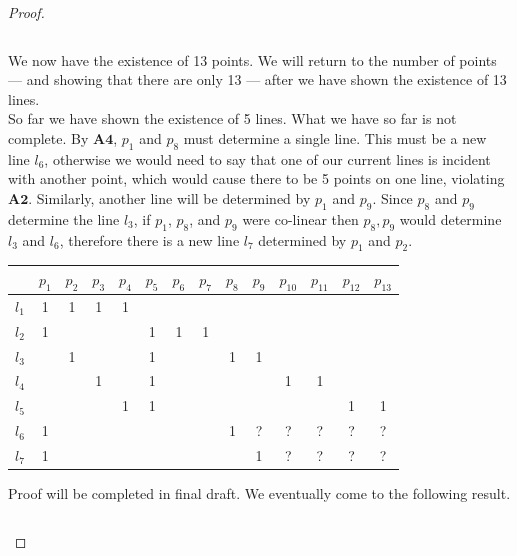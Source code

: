 \documentclass{article}
\begin{document}
\begin{proof}
\begin{center}
\begin{tabular}{ c|c|c|c|c|c|c|c|c|c|c|c|c|c }
\end{tabular}
\end{center}
We now have the existence of 13 points. We will return to the number of points --- and showing that there are only 13 --- after we have shown the existence of 13 lines. \\

So far we have shown the existence of 5 lines. What we have so far is not complete. By $\mathbf{A4}$, $p_1$ and $p_8$ must determine a single line. This must be a new line $l_6$, otherwise we would need to say that one of our current lines is incident with another point, which would cause there to be 5 points on one line, violating $\mathbf{A2}$. Similarly, another line will be determined by $p_1$ and $p_9$. Since $p_8$ and $p_9$ determine the line $l_3$, if $p_1$, $p_8$, and $p_9$ were co-linear then $p_8, p_9$ would determine $l_3$ and $l_6$, therefore there is a new line $l_7$ determined by $p_1$ and $p_2$.

\begin{center}
\begin{tabular}{ c|c|c|c|c|c|c|c|c|c|c|c|c|c } 
  & $p_1$ & $p_2$ & $p_3$ &$p_4$ &$p_5$ &$p_6$ &$p_7$ &$p_8$ &$p_9$  &$p_{10}$&$p_{11}$&$p_{12}$&$p_{13}$ \\ 
\hline
 $l_1$ & 1 & 1 & 1 & 1 &  &&& &&&&& \\ 
 \hline
 $l_2$ & 1 & &&&1&1&1&&&&&& \\
 \hline
 $l_3$ & &1&&&1&&&1&1&&&&\\
 \hline
 $l_4$ &  &  & 1 &  &1 & &&&&1&1&&\\
 \hline
 $l_5$ & &&&1&1&&&&&&&1&1\\
 \hline
 $l_6$ &1&&&&&&&1&?&?&?&?&? \\
 \hline
 $l_7$ &1&&&&&&&&1&?&?&?&?\\
 \end{tabular}
 \end{center}

Proof will be completed in final draft. We eventually come to the following result.

\begin{center}
\begin{tabular}{ c|c|c|c|c|c|c|c|c|c|c|c|c|c } 
 

\end{tabular}
\end{center}
\end{proof}
\end{document}
